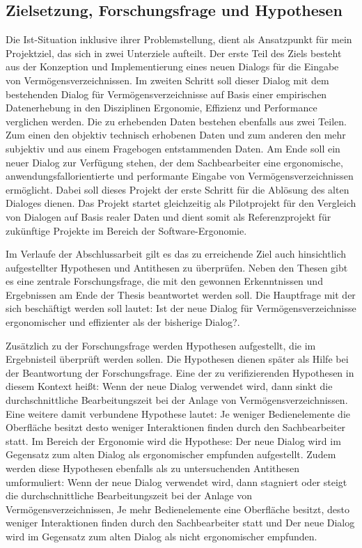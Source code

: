 \subsection{Zielsetzung, Forschungsfrage und Hypothesen}
Die Ist-Situation inklusive ihrer Problemstellung, dient als Ansatzpunkt für mein Projektziel, das sich in zwei Unterziele aufteilt. Der erste Teil des Ziels besteht aus der Konzeption und Implementierung eines neuen Dialogs für die Eingabe von Vermögensverzeichnissen. Im zweiten Schritt soll dieser Dialog mit dem bestehenden Dialog für Vermögensverzeichnisse auf Basis einer empirischen Datenerhebung in den Disziplinen Ergonomie, Effizienz und Performance verglichen werden. Die zu erhebenden Daten bestehen ebenfalls aus zwei Teilen. Zum einen den objektiv technisch erhobenen Daten und zum anderen den mehr subjektiv und aus einem Fragebogen entstammenden Daten. Am Ende soll ein neuer Dialog zur Verfügung stehen, der dem Sachbearbeiter eine ergonomische, anwendungsfallorientierte und performante Eingabe von Vermögensverzeichnissen ermöglicht. Dabei soll dieses Projekt der erste Schritt für die Ablösung des alten Dialoges dienen. Das Projekt startet gleichzeitig als Pilotprojekt für den Vergleich von Dialogen auf Basis realer Daten und dient somit als Referenzprojekt für zukünftige Projekte im Bereich der Software-Ergonomie.

Im Verlaufe der Abschlussarbeit gilt es das zu erreichende Ziel auch hinsichtlich aufgestellter Hypothesen und Antithesen zu überprüfen. Neben den Thesen gibt es eine zentrale Forschungsfrage, die mit den gewonnen Erkenntnissen und Ergebnissen am Ende der Thesis beantwortet werden soll. Die Hauptfrage mit der sich beschäftigt werden soll lautet: \glqq Ist der neue Dialog für Vermögensverzeichnisse ergonomischer und effizienter als der bisherige Dialog?\grqq{}.

Zusätzlich zu der Forschungsfrage werden Hypothesen aufgestellt, die im Ergebnisteil überprüft werden sollen. Die Hypothesen dienen später als Hilfe bei der Beantwortung der Forschungsfrage. Eine der zu verifizierenden Hypothesen in diesem Kontext heißt: \glqq Wenn der neue Dialog verwendet wird, dann sinkt die durchschnittliche Bearbeitungszeit bei der Anlage von Vermögensverzeichnissen\grqq{}. Eine weitere damit verbundene Hypothese lautet: \glqq Je weniger Bedienelemente die Oberfläche besitzt desto weniger Interaktionen finden durch den Sachbearbeiter statt\grqq{}. Im Bereich der Ergonomie wird die Hypothese: \glqq Der neue Dialog wird im Gegensatz zum alten Dialog als ergonomischer empfunden\grqq{} aufgestellt. Zudem werden diese Hypothesen ebenfalls als zu untersuchenden Antithesen umformuliert: \glqq Wenn der neue Dialog verwendet wird, dann stagniert oder steigt die durchschnittliche Bearbeitungszeit bei der Anlage von Vermögensverzeichnissen\grqq{}, \glqq Je mehr Bedienelemente eine Oberfläche besitzt, desto weniger Interaktionen finden durch den Sachbearbeiter statt\grqq{} und \glqq Der neue Dialog wird im Gegensatz zum alten Dialog als nicht ergonomischer empfunden\grqq{}.


